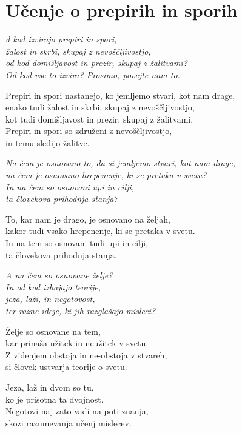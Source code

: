 \cleartorecto
{}
\chapter{Učenje o prepirih in sporih}

\emph{d kod izvirajo prepiri in spori,\\
žalost in skrbi, skupaj z nevoščljivostjo,\\
od kod domišljavost in prezir, skupaj z žalitvami?\\
Od kod vse to izvira? Prosimo, povejte nam to.}

Prepiri in spori nastanejo, ko jemljemo stvari, kot nam drage,\\
enako tudi žalost in skrbi, skupaj z nevoščljivostjo,\\
kot tudi domišljavost in prezir, skupaj z žalitvami.\\
Prepiri in spori so združeni z nevoščljivostjo,\\
in temu sledijo žalitve.

\emph{Na čem je osnovano to, da si jemljemo stvari, kot nam drage,}\\
\emph{na čem je osnovano hrepenenje, ki se pretaka v svetu?}\\
\emph{In na čem so osnovani upi in cilji,}\\
\emph{ta človekova prihodnja stanja?}

To, kar nam je drago, je osnovano na željah,\\
kakor tudi vsako hrepenenje, ki se pretaka v svetu.\\
In na tem so osnovani tudi upi in cilji,\\
ta človekova prihodnja stanja.

\clearpage

\emph{A na čem so osnovane želje?}\\
\emph{In od kod izhajajo teorije,}\\
\emph{jeza, laži, in negotovost,}\\
\emph{ter razne ideje, ki jih razglašajo misleci?}

Želje so osnovane na tem,\\
kar prinaša užitek in neužitek v svetu.\\
Z videnjem obstoja in ne-obstoja v stvareh,\\
si človek ustvarja teorije o svetu.

Jeza, laž in dvom so tu,\\
ko je prisotna ta dvojnost.\\
Negotovi naj zato vadi na poti znanja,\\
skozi razumevanja učenj mislecev.

